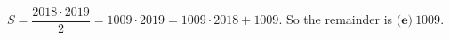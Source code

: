 $S=\dfrac{2018\cdot2019}{2}=1009\cdot2019=1009\cdot2018+1009$. So the remainder is $\boxed{\textbf{(e)}\ 1009}$.
